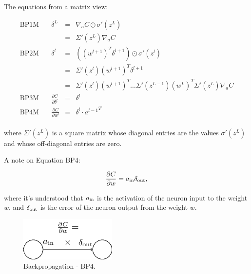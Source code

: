 \documentclass[]{book}
\begin{document}
The equations from a matrix view:

\begin{equation}
\begin{array}{cccl}
\mbox{BP1M} \quad & \delta^L & = & \nabla_a C \odot \sigma'(z^L) \\
                  &          & = & \Sigma'(z^L) \nabla_a C \\
\mbox{BP2M} \quad & \delta^l & = & ((w^{l+1})^T \delta^{l+1}) \odot \sigma'(z^l) \\
                  &          & = & \Sigma'(z^l) (w^{l+1})^T \delta^{l+1} \\
                  &          & = & \Sigma'(z^l) (w^{l+1})^T \ldots \Sigma'(z^{L-1}) (w^L)^T \Sigma'(z^L) \nabla_a C \\
\mbox{BP3M} \quad & \displaystyle \frac{\partial C}{\partial b^l} & = & \delta^l \\
\mbox{BP4M} \quad & \displaystyle \frac{\partial C}{\partial w^l} & = & \delta^l \cdot {a^{l-1}}^T\\
\end{array}
\end{equation}

where \(\Sigma'(z^L)\) is a square matrix whose diagonal entries are the
values \(\sigma'(z^L)\) and whose off-diagonal entries are zero.

A note on Equation BP4:

\begin{equation}  
\frac{\partial C}{\partial w} = a_{\rm in} \delta_{\rm out},
\end{equation}

where it's understood that \(a_{\rm in}\) is the activation of the
neuron input to the weight \(w\), and \(\delta_{\rm out}\) is the error
of the neuron output from the weight \(w\).

\begin{figure}

{\centering \includegraphics[width=0.5\linewidth]{fig/02_tikz20} 

}

\caption{Backpropagation - BP4.}\label{fig:bkpg-eq4}
\end{figure}
\end{document}
